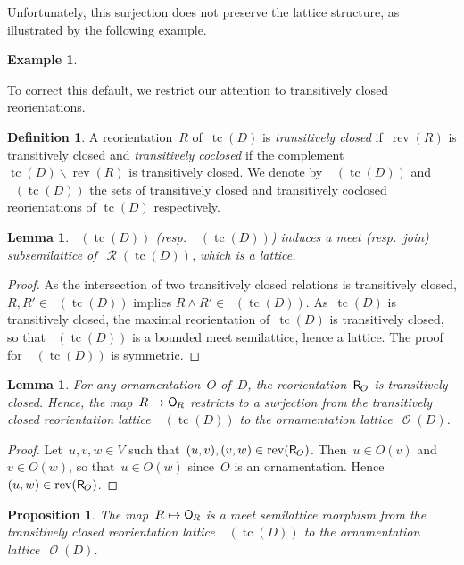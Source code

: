 \documentclass{amsart}
\newtheorem{proposition}[theorem]{Proposition}
\newtheorem{lemma}[theorem]{Lemma}
\theoremstyle{definition}
\newtheorem{definition}[theorem]{Definition}
\newtheorem{example}[theorem]{Example}
\renewcommand{\c}[1]{\mathcal{#1}} %
\newcommand{\ssm}{\smallsetminus} %
\DeclareMathOperator{\tc}{tc} %
\newcommand{\darkblue}{\color{darkblue}} %
\newcommand{\defn}[1]{\textsl{\darkblue #1}} %
\newcommand{\vincent}[1]{\todo[size=\tiny,color=blue!30]{ #1 \\ \hfill --- V.}\,}
\newcommand{\meet}{\wedge} %
\newcommand{\mymap}[2]{\mathsf{#1}_{\hspace{-.7pt}#2}}
\DeclareMathOperator{\Orn}{\c{O}}  %
\newcommand{\orn}[1]{\mymap{O}{#1}}  %
\DeclareMathOperator{\Reori}{\c{R}}  %
\newcommand{\reori}[1]{\mymap{R}{#1}}  %
\DeclareMathOperator{\Rcl}{\c{R}^{cl}}  %
\DeclareMathOperator{\Rco}{\c{R}^{co}}  %
\DeclareMathOperator{\rev}{rev} %
\begin{document}
Unfortunately, this surjection does not preserve the lattice structure, as illustrated by the following example.

\begin{example}
\vincent{todo}
\end{example}

To correct this default, we restrict our attention to transitively closed reorientations.

\begin{definition}
A reorientation~$R$ of~$\tc(D)$ is \defn{transitively closed} if~$\rev(R)$ is transitively closed %
and \defn{transitively coclosed} if the complement~$\tc(D) \ssm \rev(R)$ is transitively closed.
We denote by~$\Rcl(\tc(D))$ and $\Rco(\tc(D))$ the sets of transitively closed and transitively coclosed reorientations of $\tc(D)$ respectively.
\end{definition}

\begin{lemma}
\label{lem:rcl-subsemilattice}
$\Rcl(\tc(D))$ (resp.~$\Rco(\tc(D))$) induces a meet (resp.~join) subsemilattice of~$\Reori(\tc(D))$, which is a lattice.
\end{lemma}

\begin{proof}
As the intersection of two transitively closed relations is transitively closed, $R, R' \in \Rcl(\tc(D))$ implies $R \meet R' \in \Rcl(\tc(D))$.
As~$\tc(D)$ is transitively closed, the maximal reorientation of~$\tc(D)$ is transitively closed, so that $\Rcl(\tc(D))$ is a bounded meet semilattice, hence a lattice.
The proof for~$\Rco(\tc(D))$ is symmetric.
\end{proof}

\begin{lemma}
For any ornamentation~$O$ of~$D$, the reorientation~$\reori{O}$ is transitively closed. Hence, the map~$R \mapsto \orn{R}$ restricts to a surjection from the transitively closed reorientation lattice~$\Rcl(\tc(D))$ to the ornamentation lattice~$\Orn(D)$.
\end{lemma}

\begin{proof}
Let~$u,v,w \in V$ such that~$(u,v), (v,w) \in \rev(\reori{O})$.
Then~$u \in O(v)$ and~$v \in O(w)$, so that~$u \in O(w)$ since~$O$ is an ornamentation.
Hence~$(u,w) \in \rev(\reori{O})$.
\end{proof}

\begin{proposition}
The map~$R \mapsto \orn{R}$ is a meet semilattice morphism from the transitively closed reorientation lattice~$\Rcl(\tc(D))$ to the ornamentation lattice~$\Orn(D)$.
\end{proposition}
\end{document}
